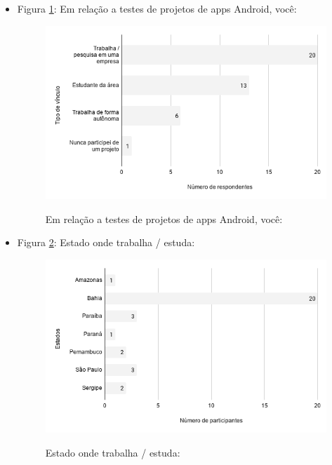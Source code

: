 \begin{itemize}
    
    \item Figura \ref{figure:s_projetos}: Em relação a testes de projetos de apps Android, você:
        \begin{figure}[!htb]
        \centering
        \includegraphics[width=.80\textwidth]{images/s_projetos.png}
        \label{figure:s_projetos}
        \caption{Em relação a testes de projetos de apps Android, você:}
        \end{figure}
    
    
    \item Figura \ref{figure:s_estado}: Estado onde trabalha / estuda:
        \begin{figure}[!htb]
        \centering
        \includegraphics[width=.80\textwidth]{images/s_estado.png}
        \label{figure:s_estado}
        \caption{Estado onde trabalha / estuda:}
        \end{figure}



\end{itemize}
